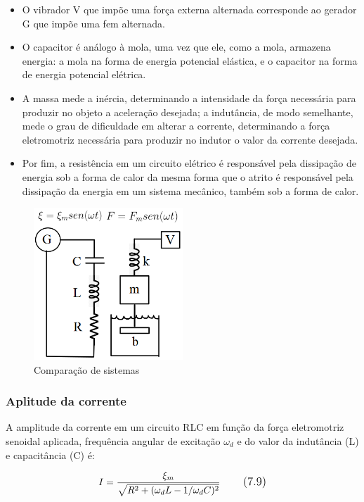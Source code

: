 \begin{itemize}
\item O vibrador V que impõe uma força externa alternada corresponde ao gerador G que impõe uma fem alternada. 
\item O capacitor é análogo à mola, uma vez que ele, como a mola, armazena energia: a mola na forma de energia potencial elástica, e o capacitor na forma de energia potencial elétrica.
\item A massa mede a inércia, determinando a intensidade da força necessária para produzir no objeto a aceleração desejada; a indutância, de modo semelhante, mede o grau de dificuldade em alterar a corrente, determinando a força eletromotriz necessária para produzir no indutor o valor da corrente desejada.
\item Por fim, a resistência em um circuito elétrico é responsável pela dissipação de energia sob a forma de calor da mesma forma que o atrito é responsável pela dissipação da energia em um sistema mecânico, também sob a forma de calor.
\end{itemize}

\begin{figure}[H]
	\centering
	\includegraphics[width=0.5\textwidth]{./Imagens/RLC/rlc3.png} 
	\caption{Comparação de sistemas}
	\label{fig:RLC3}
\end{figure}

\subsubsection{Aplitude da corrente}

A amplitude da corrente em um circuito RLC em função da força eletromotriz senoidal aplicada, frequência angular de excitação $\omega_{d}$ e do valor da indutância (L) e capacitância (C) é:

\begin{equation}
\large I = \frac{\xi_{m}}{\sqrt{R^2+(\omega_{d}L-1/\omega_{d}C)^2}}
\tag{7.9}
\end{equation}

